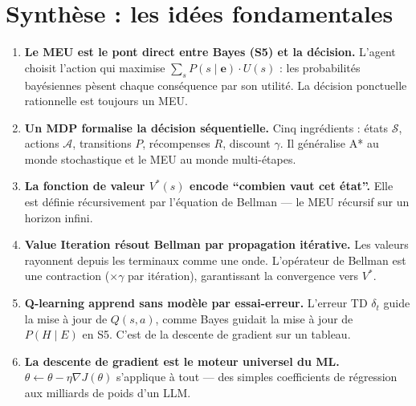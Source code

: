 \documentclass[11pt,a4paper]{article}
\begin{document}
\section{Synthèse : les idées fondamentales}

\begin{retenirbox}
\begin{enumerate}
    \item \textbf{Le MEU est le pont direct entre Bayes (S5) et la décision.} L'agent choisit l'action qui maximise $\sum_s P(s \mid \mathbf{e}) \cdot U(s)$ : les probabilités bayésiennes pèsent chaque conséquence par son utilité. La décision ponctuelle rationnelle est toujours un MEU.

    \item \textbf{Un MDP formalise la décision séquentielle.} Cinq ingrédients : états $\mathcal{S}$, actions $\mathcal{A}$, transitions $P$, récompenses $R$, discount $\gamma$. Il généralise A* au monde stochastique et le MEU au monde multi-étapes.

    \item \textbf{La fonction de valeur $V^*(s)$ encode ``combien vaut cet état''.} Elle est définie récursivement par l'équation de Bellman --- le MEU récursif sur un horizon infini.

    \item \textbf{Value Iteration résout Bellman par propagation itérative.} Les valeurs rayonnent depuis les terminaux comme une onde. L'opérateur de Bellman est une contraction ($\times\gamma$ par itération), garantissant la convergence vers $V^*$.

    \item \textbf{Q-learning apprend sans modèle par essai-erreur.} L'erreur TD $\delta_t$ guide la mise à jour de $Q(s,a)$, comme Bayes guidait la mise à jour de $P(H \mid E)$ en S5. C'est de la descente de gradient sur un tableau.

    \item \textbf{La descente de gradient est le moteur universel du ML.} $\theta \leftarrow \theta - \eta \nabla J(\theta)$ s'applique à tout --- des simples coefficients de régression aux milliards de poids d'un LLM.
\end{enumerate}
\end{retenirbox}
\end{document}
